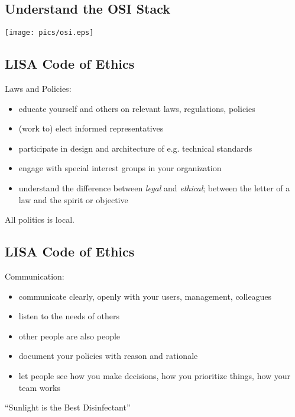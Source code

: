 \documentclass[xga]{xdvislides}
\begin{document}
\subsection{Understand the OSI Stack}
\vspace*{\fill}
\begin{center}
	\texttt{[image: pics/osi.eps]}
\end{center}
\vspace*{\fill}

\subsection{LISA Code of Ethics}
Laws and Policies:
\begin{itemize}
	\item educate yourself and others on relevant laws, regulations, policies
	\item (work to) elect informed representatives
	\item participate in design and architecture of e.g. technical standards
	\item engage with special interest groups in your organization
	\item understand the difference between {\em
legal} and {\em ethical}; between the letter of a law
and the spirit or objective
\end{itemize}
\vspace{.5in}
All politics is local.


\subsection{LISA Code of Ethics}
Communication:
\begin{itemize}
	\item communicate clearly, openly with your users, management, colleagues
	\item listen to the needs of others
	\item other people are also people
	\item document your policies with reason and rationale
	\item let people see how you make decisions,
		how you prioritize things, how your team works
\end{itemize}
\vspace{.5in}
``Sunlight is the Best Disinfectant''
\end{document}
